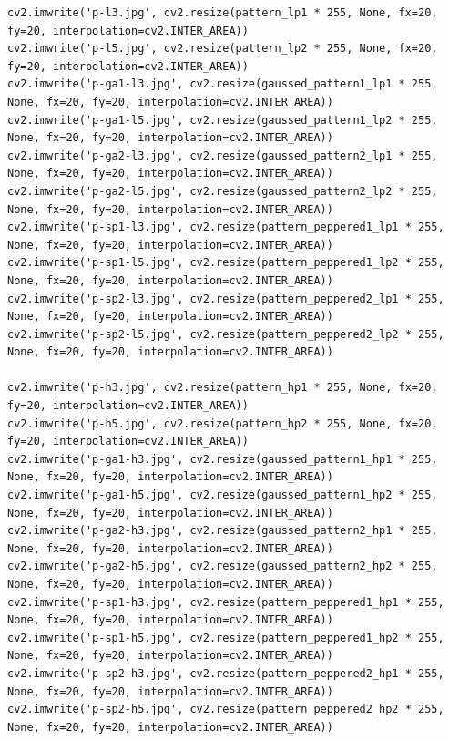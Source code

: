 \documentclass{article}
\begin{document}
\begin{verbatim}
cv2.imwrite('p-l3.jpg', cv2.resize(pattern_lp1 * 255, None, fx=20, fy=20, interpolation=cv2.INTER_AREA))
cv2.imwrite('p-l5.jpg', cv2.resize(pattern_lp2 * 255, None, fx=20, fy=20, interpolation=cv2.INTER_AREA))
cv2.imwrite('p-ga1-l3.jpg', cv2.resize(gaussed_pattern1_lp1 * 255, None, fx=20, fy=20, interpolation=cv2.INTER_AREA))
cv2.imwrite('p-ga1-l5.jpg', cv2.resize(gaussed_pattern1_lp2 * 255, None, fx=20, fy=20, interpolation=cv2.INTER_AREA))
cv2.imwrite('p-ga2-l3.jpg', cv2.resize(gaussed_pattern2_lp1 * 255, None, fx=20, fy=20, interpolation=cv2.INTER_AREA))
cv2.imwrite('p-ga2-l5.jpg', cv2.resize(gaussed_pattern2_lp2 * 255, None, fx=20, fy=20, interpolation=cv2.INTER_AREA))
cv2.imwrite('p-sp1-l3.jpg', cv2.resize(pattern_peppered1_lp1 * 255, None, fx=20, fy=20, interpolation=cv2.INTER_AREA))
cv2.imwrite('p-sp1-l5.jpg', cv2.resize(pattern_peppered1_lp2 * 255, None, fx=20, fy=20, interpolation=cv2.INTER_AREA))
cv2.imwrite('p-sp2-l3.jpg', cv2.resize(pattern_peppered2_lp1 * 255, None, fx=20, fy=20, interpolation=cv2.INTER_AREA))
cv2.imwrite('p-sp2-l5.jpg', cv2.resize(pattern_peppered2_lp2 * 255, None, fx=20, fy=20, interpolation=cv2.INTER_AREA))

cv2.imwrite('p-h3.jpg', cv2.resize(pattern_hp1 * 255, None, fx=20, fy=20, interpolation=cv2.INTER_AREA))
cv2.imwrite('p-h5.jpg', cv2.resize(pattern_hp2 * 255, None, fx=20, fy=20, interpolation=cv2.INTER_AREA))
cv2.imwrite('p-ga1-h3.jpg', cv2.resize(gaussed_pattern1_hp1 * 255, None, fx=20, fy=20, interpolation=cv2.INTER_AREA))
cv2.imwrite('p-ga1-h5.jpg', cv2.resize(gaussed_pattern1_hp2 * 255, None, fx=20, fy=20, interpolation=cv2.INTER_AREA))
cv2.imwrite('p-ga2-h3.jpg', cv2.resize(gaussed_pattern2_hp1 * 255, None, fx=20, fy=20, interpolation=cv2.INTER_AREA))
cv2.imwrite('p-ga2-h5.jpg', cv2.resize(gaussed_pattern2_hp2 * 255, None, fx=20, fy=20, interpolation=cv2.INTER_AREA))
cv2.imwrite('p-sp1-h3.jpg', cv2.resize(pattern_peppered1_hp1 * 255, None, fx=20, fy=20, interpolation=cv2.INTER_AREA))
cv2.imwrite('p-sp1-h5.jpg', cv2.resize(pattern_peppered1_hp2 * 255, None, fx=20, fy=20, interpolation=cv2.INTER_AREA))
cv2.imwrite('p-sp2-h3.jpg', cv2.resize(pattern_peppered2_hp1 * 255, None, fx=20, fy=20, interpolation=cv2.INTER_AREA))
cv2.imwrite('p-sp2-h5.jpg', cv2.resize(pattern_peppered2_hp2 * 255, None, fx=20, fy=20, interpolation=cv2.INTER_AREA))


\end{verbatim}
\end{document}
